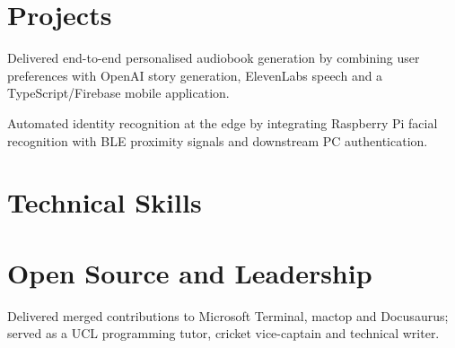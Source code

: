 \vfill
\section{Projects}

\begin{resumeBullets}
  \item Delivered end-to-end personalised audiobook generation by combining user preferences with OpenAI story generation, ElevenLabs speech and a TypeScript/Firebase mobile application.
\end{resumeBullets}

\begin{resumeBullets}
  \item Automated identity recognition at the edge by integrating Raspberry Pi facial recognition with BLE proximity signals and downstream PC authentication.
\end{resumeBullets}

\vfill
\section{Technical Skills}

\vfill
\section{Open Source and Leadership}
\begin{resumeBullets}
  \item Delivered merged contributions to Microsoft Terminal, mactop and Docusaurus; served as a UCL programming tutor, cricket vice-captain and technical writer.
\end{resumeBullets}
